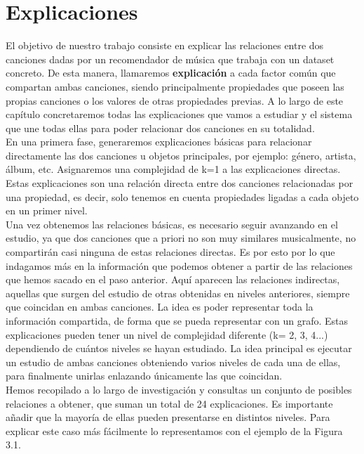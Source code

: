 \chapter{Explicaciones}
\label{cap:descripcionTrabajo}

El objetivo de nuestro trabajo consiste en explicar las relaciones entre dos canciones dadas por un recomendador de música que trabaja con un dataset concreto. De esta manera, llamaremos \textbf{explicación} a cada factor común que compartan ambas canciones, siendo principalmente propiedades que poseen las propias canciones o los valores de otras propiedades previas. A lo largo de este capítulo concretaremos todas las explicaciones que vamos a estudiar y el sistema que une todas ellas para poder relacionar dos canciones en su totalidad.\\

En una primera fase, generaremos explicaciones básicas para relacionar directamente las dos canciones u objetos principales, por ejemplo: género, artista, álbum, etc. Asignaremos una complejidad de k=1 a las explicaciones directas. Estas explicaciones son una relación directa entre dos canciones relacionadas por una propiedad, es decir, solo tenemos en cuenta propiedades ligadas a cada objeto en un primer nivel.\\

Una vez obtenemos las relaciones básicas, es necesario seguir avanzando en el estudio, ya que dos canciones que a priori no son muy similares musicalmente, no compartirán casi ninguna de estas relaciones directas. Es por esto por lo que indagamos más en la información que podemos obtener a partir de las relaciones que hemos sacado en el paso anterior. Aquí aparecen las relaciones indirectas, aquellas que surgen del estudio de otras obtenidas en niveles anteriores, siempre que coincidan en ambas canciones. La idea es poder representar toda la información compartida, de forma que se pueda representar con un grafo. Estas explicaciones pueden tener un nivel de complejidad diferente (k= 2, 3, 4...) dependiendo de cuántos niveles se hayan estudiado. La idea principal es ejecutar un estudio de ambas canciones obteniendo varios niveles de cada una de ellas, para finalmente unirlas enlazando únicamente las que coincidan.\\


Hemos recopilado a lo largo de investigación y consultas un conjunto de posibles relaciones a obtener, que suman un total de 24 explicaciones. Es importante añadir que la mayoría de ellas pueden presentarse en distintos niveles. Para explicar este caso más fácilmente lo representamos con el ejemplo de la Figura 3.1.\\


